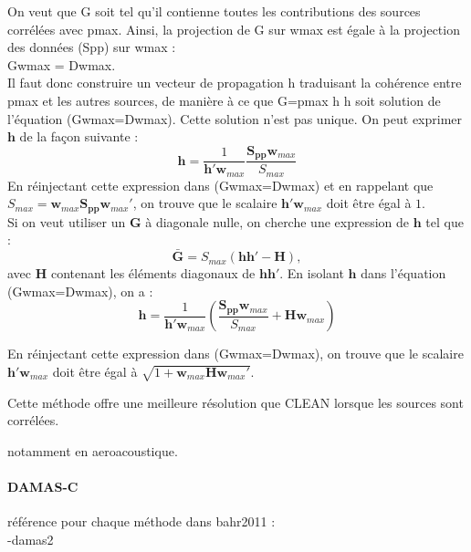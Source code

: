 On veut que G soit tel qu'il contienne toutes les contributions des sources corrélées avec pmax. Ainsi, la projection de G sur wmax est égale à la projection des données (Spp) sur wmax : \\
Gwmax = Dwmax.\\

Il faut donc construire un vecteur de propagation h traduisant la cohérence entre pmax et les autres sources, de manière à ce que 
G=pmax h h 
soit solution de l'équation (Gwmax=Dwmax). 
Cette solution n'est pas unique. On peut exprimer $\bm{h}$ de la façon suivante : 
\begin{equation}
	\bm{h}=\frac{1}{\bm{h}'\bm{w}_{max}}  \frac{\bm{S_{pp}}\bm{w}_{max}}{S_{max}}
\end{equation}
En réinjectant cette expression dans (Gwmax=Dwmax) et en rappelant que $S_{max} = \bm{w}_{max}\bm{S_{pp}}\bm{w}_{max}'$, on trouve que le scalaire $\bm{h}'\bm{w}_{max}$ doit être égal à $1$.\\

Si on veut utiliser un $\bm{G}$ à diagonale nulle, on cherche une expression de $\bm{h}$ tel que : 
\begin{equation}
	\bar{\bm{G}} = S_{max} (\bm{hh}'-\bm{H}),
\end{equation}
avec $\bm{H}$ contenant les éléments diagonaux de $\bm{hh}'$. En isolant $\bm{h}$ dans l'équation (Gwmax=Dwmax), on a : 
\begin{equation}
	\bm{h}=\frac{1}{\bm{h}'\bm{w}_{max}}  \left( \frac{\bm{S_{pp}}\bm{w}_{max}}{S_{max}} + \bm{H}\bm{w}_{max} \right)
\end{equation}

En réinjectant cette expression dans (Gwmax=Dwmax), on trouve que le scalaire $\bm{h}'\bm{w}_{max}$ doit être égal à $\sqrt{1+\bm{w}_{max}\bm{H}\bm{w}_{max}'}$.




Cette méthode offre une meilleure résolution que CLEAN lorsque les sources sont corrélées.

notamment en aeroacoustique.


\paragraph{DAMAS-C}





référence pour chaque méthode dans bahr2011 : \\
-damas2\\

